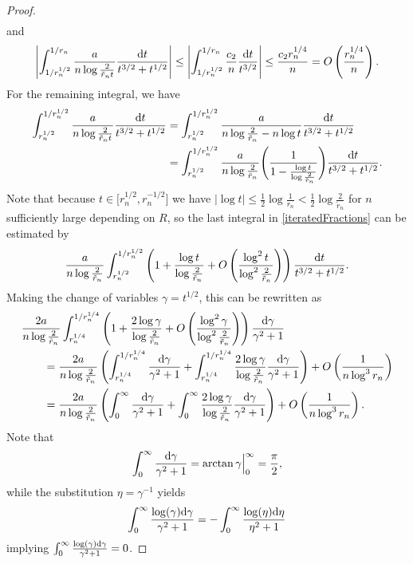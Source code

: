 \begin{proof}
\begin{align*}
\end{align*}
and
\begin{align*}
 \left|\int_{1/r_n^{1/2}}^{1/r_n} \frac{a}{n\log \frac{2}{\tilde r_n t}} \frac{{\rm d}t}{t^{3/2}+t^{1/2}} \right| \leq \left|\int_{1/r_n^{1/2}}^{1/r_n} \frac{c_2}{n} \frac{{\rm d}t}{t^{3/2}}\right| \leq \frac{c_2 r_n^{1/4}}{n} = O\left(\frac{r_n^{1/4}}{n}\right).
\end{align*}
For the remaining integral, we have
\begin{align}\nonumber
 \int_{r_n^{1/2}}^{1/r_n^{1/2}} \frac{a}{n\log \frac{2}{\tilde r_n t}} \frac{{\rm d}t}{t^{3/2}+t^{1/2}} &=
 \int_{r_n^{1/2}}^{1/r_n^{1/2}} \frac{a}{n\log \frac{2}{\tilde r_n }-n \log t} \frac{{\rm d}t}{t^{3/2}+t^{1/2}}
 \\\label{iteratedFractions}
 &= \int_{r_n^{1/2}}^{1/r_n^{1/2}} \frac{a}{n\log \frac{2}{\tilde r_n }} \Bigg(\frac{1}{1-\frac{\log t}{\log \frac{2}{\tilde r_n}}} \Bigg) \frac{{\rm d}t}{t^{3/2}+t^{1/2}}.
\end{align}
Note that because $t \in \big[r_n^{1/2}, r_n^{-1/2}\big]$ we have $|\log t| \leq \frac{1}{2} \log{\frac{1}{r_n}} < \frac{1}{2} \log{\frac{2}{\tilde r_n}}$ for $n$ sufficiently large depending on $R$, so the last integral in \eqref{iteratedFractions} can be estimated by
\begin{align*}
 \frac{a}{n\log \frac{2}{\tilde r_n }} \int_{r_n^{1/2}}^{1/r_n^{1/2}} \left(1+\frac{\log t}{\log \frac{2}{\tilde r_n}} + O \left( \frac{\log^2 t}{\log^2 \frac{2}{\tilde r_n}} \right)\right) \frac{{\rm d}t}{t^{3/2}+t^{1/2}}.
\end{align*}
Making the change of variables $\gamma = t^{1/2}$, this can be rewritten as
\begin{align*}
 &\frac{2a}{n\log \frac{2}{\tilde r_n }} \int_{r_n^{1/4}}^{1/r_n^{1/4}} \left(1+\frac{2\log \gamma}{\log \frac{2}{\tilde r_n}} + O \left( \frac{\log^2 \gamma}{\log^2 \frac{2}{\tilde r_n}} \right)\right) \frac{{\rm d}\gamma}{\gamma^{2}+1}
 \\
 &\qquad= \frac{2a}{n\log \frac{2}{\tilde r_n }} \left(\int_{r_n^{1/4}}^{1/r_n^{1/4}} \frac{{\rm d}\gamma}{\gamma^{2}+1} + \int_{r_n^{1/4}}^{1/r_n^{1/4}} \frac{2\log \gamma}{\log \frac{2}{\tilde r_n}} \frac{{\rm d}\gamma}{\gamma^{2}+1} \right)+ O\left(\frac{1}{n \log^3 r_n}\right)
 \\
 &\qquad= \frac{2a}{n\log \frac{2}{\tilde r_n }} \left(\int_{0}^{\infty} \frac{{\rm d}\gamma}{\gamma^{2}+1} + \int_{0}^{\infty} \frac{2\log \gamma}{\log \frac{2}{\tilde r_n}} \frac{{\rm d}\gamma}{\gamma^{2}+1}\right) + O\left(\frac{1}{n \log^3 r_n}\right).
\end{align*}
Note that
\begin{align*}
 \int_{0}^{\infty} \frac{{\rm d}\gamma}{\gamma^{2}+1} = \arctan \gamma \Big|^\infty_0 = \frac{\pi}{2},
\end{align*}
while the substitution $\eta = \gamma^{-1}$ yields
\begin{align*}
 \int_{0}^{\infty} \frac{\log(\gamma){\rm d}\gamma}{\gamma^{2}+1} = - \int_{0}^{\infty} \frac{\log(\eta){\rm d}\eta}{\eta^{2}+1}
\end{align*}
implying $\int_{0}^{\infty} \frac{\log(\gamma){\rm d}\gamma}{\gamma^{2}+1} = 0$.


\end{proof}
